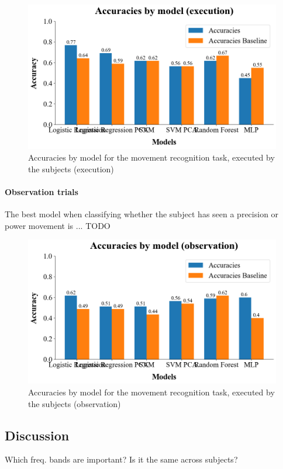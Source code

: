 \documentclass[10pt,conference,compsocconf]{IEEEtran}
\begin{document}
\begin{figure}[h!]
  \center
  \includegraphics[width=\linewidth]{images/2024-12-15-14-43-56.png}
  \caption{Accuracies by model for the movement recognition task, executed by the subjects (execution)}
\end{figure}
\FloatBarrier

\paragraph{Observation trials}
The best model when classifying whether the subject has seen a precision or power movement is ... TODO

\begin{figure}[h!]
  \center
  \includegraphics[width=\linewidth]{images/2024-12-15-14-54-12.png}
  \caption{Accuracies by model for the movement recognition task, executed by the subjects (observation)}
\end{figure}
\FloatBarrier

\subsection{Discussion}
Which freq. bands are important? Is it the same across subjects?
\end{document}
